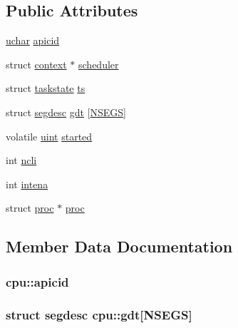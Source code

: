 \subsection*{Public Attributes}
\begin{DoxyCompactItemize}
\item 
\hyperlink{types_8h_a65f85814a8290f9797005d3b28e7e5fc}{uchar} \hyperlink{structcpu_ad08a3478ec15fc8bec1d9b6b5a0431db}{apicid}
\item 
struct \hyperlink{structcontext}{context} $\ast$ \hyperlink{structcpu_aaa1510fdf8a2230c033d04e13e4fdd9e}{scheduler}
\item 
struct \hyperlink{structtaskstate}{taskstate} \hyperlink{structcpu_a32e7b5aa877171c943d47038e818a159}{ts}
\item 
struct \hyperlink{structsegdesc}{segdesc} \hyperlink{structcpu_aee38fb8832f8e728538b2cee877d1c09}{gdt} \mbox{[}\hyperlink{mmu_8h_a2fca412c6ed6584438e96f43ccce030a}{N\+S\+E\+GS}\mbox{]}
\item 
volatile \hyperlink{types_8h_a91ad9478d81a7aaf2593e8d9c3d06a14}{uint} \hyperlink{structcpu_a869f6e0e1dbf69de0bdb3546f981847f}{started}
\item 
int \hyperlink{structcpu_a9ccad8ae031c295f86e96de26df24805}{ncli}
\item 
int \hyperlink{structcpu_a26fc271fea8af30d67fc2ae22ef0a82f}{intena}
\item 
struct \hyperlink{structproc}{proc} $\ast$ \hyperlink{structcpu_a9e71a6265904fd644875a9ea5a413c89}{proc}
\end{DoxyCompactItemize}


\subsection{Member Data Documentation}
\subsubsection[{\texorpdfstring{apicid}{apicid}}]{ cpu\+::apicid}\hypertarget{structcpu_ad08a3478ec15fc8bec1d9b6b5a0431db}{}\label{structcpu_ad08a3478ec15fc8bec1d9b6b5a0431db}
\subsubsection[{\texorpdfstring{gdt}{gdt}}]{\setlength{\rightskip}{0pt plus 5cm}struct {\bf segdesc} cpu\+::gdt\mbox{[}{\bf N\+S\+E\+GS}\mbox{]}}\hypertarget{structcpu_aee38fb8832f8e728538b2cee877d1c09}{}\label{structcpu_aee38fb8832f8e728538b2cee877d1c09}
